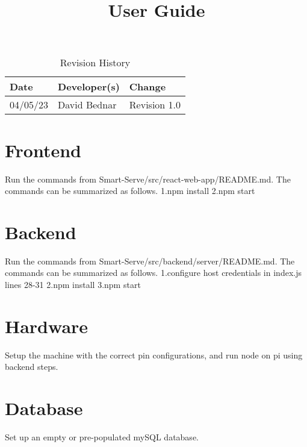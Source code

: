 \documentclass{article}
\title{User Guide\\\progname}
\author{\authname}
\date{}
\begin{document}
\newpage

\maketitle

\newpage

\tableofcontents

\addlinespace
\addlinespace
\addlinespace
\addlinespace

\begin{table}[hp]
\caption{Revision History} \label{TblRevisionHistory}
\begin{tabularx}{\textwidth}{llX}
\toprule
\textbf{Date} & \textbf{Developer(s)} & \textbf{Change}\\
\midrule
04/05/23 & David Bednar & Revision 1.0 \\
\bottomrule
\end{tabularx}
\end{table}

\newpage

\section{Frontend}
Run the commands from Smart-Serve/src/react-web-app/README.md.
The commands can be summarized as follows.
\addlinespace
1.npm install
\addlinespace
2.npm start
\section{Backend}
Run the commands from Smart-Serve/src/backend/server/README.md.
The commands can be summarized as follows.
\addlinespace
1.configure host credentials in index.js lines 28-31
\addlinespace
2.npm install
\addlinespace
3.npm start
\section{Hardware}
Setup the machine with the correct pin configurations, and run node on pi using backend steps.
\section{Database}
Set up an empty or pre-populated mySQL database.
\end{document}
